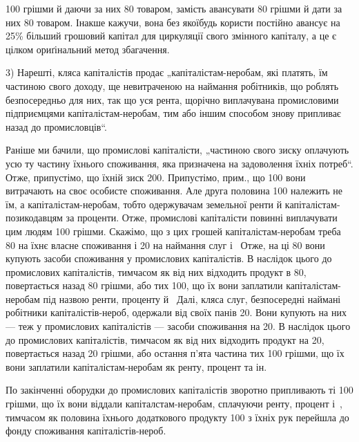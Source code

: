 \parcont{}  %
100 грішми й даючи за них 80 товаром, замість авансувати 80 грішми й
дати за них 80 товаром. Інакше кажучи, вона без якоїбудь користи постійно авансує на 25\%
більший грошовий капітал для циркуляції свого змінного капіталу, а це є цілком ориґінальний метод
збагачення.

3) Нарешті, кляса капіталістів продає „капіталістам-неробам, які платять, їм частиною свого доходу,
ще невитраченою на наймання робітників, що роблять безпосередньо для них, так що уся рента, щорічно
виплачувана промисловими підприємцями капіталістам-неробам, тим або іншим способом знову припливає
назад до промисловців“.

Раніше ми бачили, що промислові капіталісти, „частиною свого зиску оплачують усю ту частину їхнього
споживання, яка призначена на задоволення їхніх потреб“. Отже, припустімо, що їхній зиск \deq{} 200. Припустімо, прим., що 100 вони витрачають на своє особисте споживання. Але друга
половина \deq{} 100 належить не їм, а капіталістам-неробам, тобто одержувачам земельної ренти й
капіталістам-позикодавцям
за проценти. Отже, промислові капіталісти повинні виплачувати цим людям 100 грішми.
Скажімо, що з цих грошей капіталістам-неробам треба 80 на їхнє власне споживання і 20 на наймання слуг і~ Отже, на ці 80 вони купують засоби споживання у
промислових капіталістів. В наслідок цього до промислових капіталістів, тимчасом як від них
відходить продукт в 80, повертається назад 80 грішми, або  тих 100,
що їх вони заплатили капіталістам-неробам під назвою ренти, проценту й~ Далі, кляса слуг,
безпосередні наймані робітники капіталістів-нероб, одержали від своїх панів 20. Вони
купують на них — теж у промислових капіталістів — засоби споживання на 20. В наслідок цього
до промислових капіталістів, тимчасом як від них відходить продукт на 20, повертається
назад 20 грішми, або остання п’ята частина тих 100 грішми, що їх вони заплатили
капіталістам-неробам як ренту, процент та ін.

По закінченні оборудки до промислових капіталістів зворотно припливають ті 100 грішми, що
їх вони віддали капіталстам-неробам, сплачуючи ренту, процент і~, тимчасом як половина їхнього
додаткового продукту \deq{} 100 з їхніх рук перейшла до фонду споживання капіталістів-нероб.

